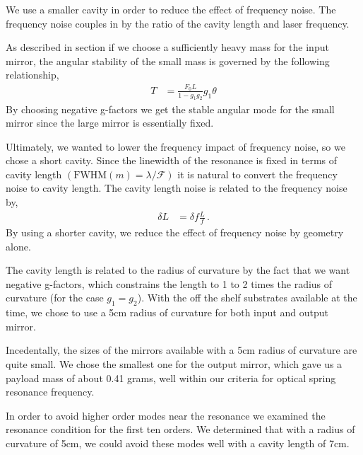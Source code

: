 %
%

We use a smaller cavity in order to reduce the effect of frequency noise.
The frequency noise couples in by the ratio of the cavity length and
laser frequency.


%
%

As described in section  if we choose a sufficiently heavy mass for the
input mirror, the angular stability of the small mass is governed by the
following relationship,
\begin{align}
T &= \frac{F_0 L}{1 - g_1 g_2} g_1 \theta
\end{align}
By choosing negative g-factors we get the stable angular mode for the small
mirror since the large mirror is essentially fixed.


%
%

Ultimately, we wanted to lower the frequency impact of frequency noise, so we
chose a short cavity.
Since the linewidth of the resonance is fixed in terms of cavity length
$ ( \mathrm{FWHM}(m) = \lambda / \mathcal{F} ) $ it is
natural to convert the frequency noise to cavity length.
The cavity length noise is related to the frequency noise by,
\begin{align}
\delta L &= \delta f \frac{L}{f} \, .
\end{align}
By using a shorter cavity, we reduce the effect of frequency noise by geometry
alone.

The cavity length is related to the radius of curvature by the fact that we want
negative g-factors, which constrains the length to 1 to 2 times the radius of
curvature (for the case $g_1 = g_2$).
With the off the shelf substrates available at the time, we chose to use a 5cm
radius of curvature for both input and output mirror.

Incedentally, the sizes of the mirrors available with a 5cm radius of curvature
are quite small.
We chose the smallest one for the output mirror, which gave us a payload mass of
about 0.41 grams, well within our criteria for optical spring resonance frequency.

In order to avoid higher order modes near the resonance we examined the resonance
condition for the first ten orders.
We determined that with a radius of curvature of 5cm, we could avoid these modes
well with a cavity length of 7cm.

